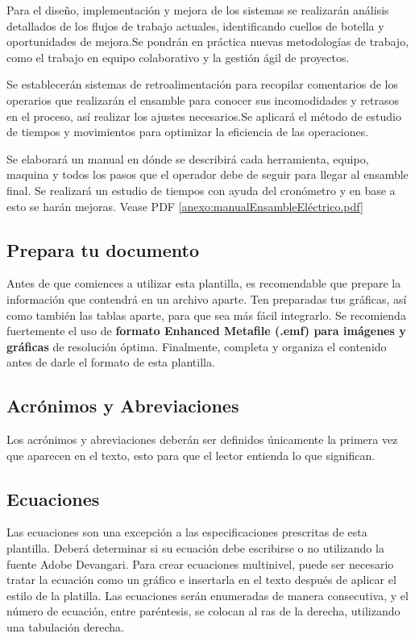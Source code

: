 Para el diseño, implementación y mejora de los sistemas se realizarán análisis detallados de los flujos de trabajo actuales, identificando cuellos de botella y oportunidades de mejora.Se pondrán en práctica nuevas metodologías de trabajo, como el trabajo en equipo colaborativo y la gestión ágil de proyectos.


Se establecerán sistemas de retroalimentación para recopilar comentarios de los operarios que realizarán el ensamble para conocer sus incomodidades y retrasos en el proceso, así realizar los ajustes necesarios.Se aplicará el método de estudio de tiempos y movimientos para optimizar la eficiencia de las operaciones.

Se elaborará un manual en dónde se describirá cada herramienta, equipo, maquina y todos los pasos que el operador debe de seguir para llegar al ensamble final. Se realizará un estudio de tiempos con ayuda del cronómetro y en base a esto se harán mejoras. Vease PDF \ref{anexo:manualEnsambleEléctrico.pdf}



\subsection{Prepara tu documento}

Antes de que comiences a utilizar esta plantilla, es recomendable que prepare la información que contendrá en un archivo aparte. 
Ten preparadas tus gráficas, así como también las tablas aparte, para que sea más fácil integrarlo. 
Se recomienda fuertemente el uso de \textbf{formato Enhanced Metafile (.emf) para imágenes y gráficas} de resolución óptima. 
Finalmente, completa y organiza el contenido antes de darle el formato de esta plantilla. 

\subsection{Acrónimos y Abreviaciones}

Los acrónimos y abreviaciones deberán ser definidos únicamente la primera vez que aparecen en el texto, esto para que el lector entienda lo que significan.

\subsection{Ecuaciones}

Las ecuaciones son una excepción a las especificaciones prescritas de esta plantilla. 
Deberá determinar si su ecuación debe escribirse o no utilizando la fuente Adobe Devangari. 
Para crear ecuaciones multinivel, puede ser necesario tratar la ecuación como un gráfico e insertarla en el texto después de aplicar el estilo de la platilla.
Las ecuaciones serán enumeradas de manera consecutiva, y el número de ecuación, entre paréntesis, se colocan al ras de la derecha, utilizando una tabulación derecha. 


